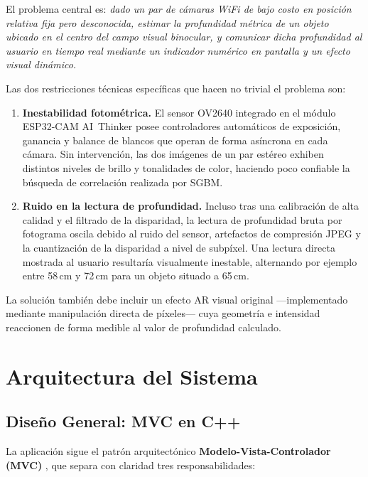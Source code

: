 \documentclass[12pt, a4paper]{article}
\begin{document}
El problema central es: \textit{dado un par de cámaras WiFi de bajo costo en posición
relativa fija pero desconocida, estimar la profundidad métrica de un objeto ubicado en
el centro del campo visual binocular, y comunicar dicha profundidad al usuario en tiempo
real mediante un indicador numérico en pantalla y un efecto visual dinámico.}

Las dos restricciones técnicas específicas que hacen no trivial el problema son:

\begin{enumerate}
  \item \textbf{Inestabilidad fotométrica.} El sensor OV2640 integrado en el módulo
        ESP32-CAM AI~Thinker posee controladores automáticos de exposición, ganancia y
        balance de blancos que operan de forma asíncrona en cada cámara. Sin
        intervención, las dos imágenes de un par estéreo exhiben distintos niveles de
        brillo y tonalidades de color, haciendo poco confiable la búsqueda de
        correlación realizada por SGBM.
  \item \textbf{Ruido en la lectura de profundidad.} Incluso tras una calibración de
        alta calidad y el filtrado de la disparidad, la lectura de profundidad bruta por
        fotograma oscila debido al ruido del sensor, artefactos de compresión JPEG y la
        cuantización de la disparidad a nivel de subpíxel. Una lectura directa mostrada
        al usuario resultaría visualmente inestable, alternando por ejemplo entre 58\,cm
        y 72\,cm para un objeto situado a 65\,cm.
\end{enumerate}

La solución también debe incluir un efecto AR visual original —implementado mediante
manipulación directa de píxeles— cuya geometría e intensidad reaccionen de forma
medible al valor de profundidad calculado.

\section{Arquitectura del Sistema}

\subsection{Diseño General: MVC en C++}

La aplicación sigue el patrón arquitectónico \textbf{Modelo-Vista-Controlador
(MVC)} \cite{gamma1994design}, que separa con claridad tres responsabilidades:
\end{document}
